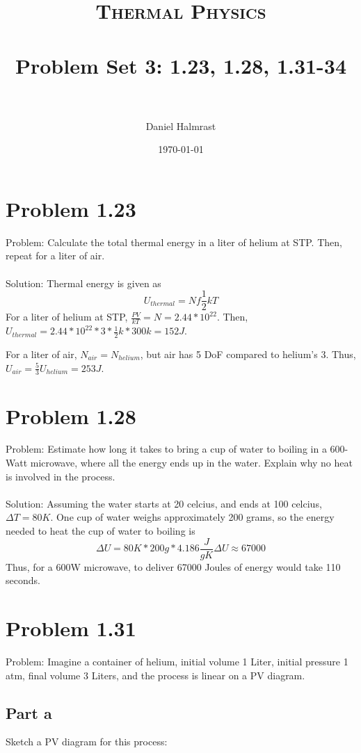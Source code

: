 \documentclass[paper=a4, fontsize=11pt]{scrartcl} %
\title{	
\normalfont \normalsize 
\textsc{Thermal Physics} \\ [25pt] %
\horrule{0.5pt} \\[0.4cm] %
\huge Problem Set 3: 1.23, 1.28, 1.31-34 \\ %
\horrule{2pt} \\[0.5cm] %
}
\author{Daniel Halmrast} %
\date{\normalsize\today} %
\numberwithin{equation}{section} %
\numberwithin{figure}{section} %
\numberwithin{table}{section} %
\begin{document}
\maketitle %


\section*{Problem 1.23}
Problem: Calculate the total thermal energy in a liter of helium at STP. Then, repeat for
a liter of air.
\\
\\
Solution:
Thermal energy is given as
\[
U_{thermal} = Nf\frac{1}{2}kT
\]
For a liter of helium at STP, $\frac{PV}{kT}=N=2.44*10^{22}$.
Then, $U_{thermal}=2.44*10^{22}*3*\frac{1}{2}k*300k=152J$.

For a liter of air, $N_{air}=N_{helium}$, but air has 5 DoF compared to helium's 3.
Thus, $U_{air}=\frac{5}{3}U_{helium}=253J$.

\section*{Problem 1.28}
Problem: Estimate how long it takes to bring a cup of water to boiling in a 600-Watt microwave,
where all the energy ends up in the water. Explain why no heat is involved in the process.
\\
\\
Solution:
Assuming the water starts at 20 celcius, and ends at 100 celcius, $\Delta T=80K$.
One cup of water weighs approximately 200 grams, so the energy needed to heat the cup of
water to boiling is
\[
\Delta U = 80K*200g*4.186\frac{J}{gK}
\Delta U \approx 67000
\]
Thus, for a 600W microwave, to deliver 67000 Joules of energy would take 110 seconds.

\section*{Problem 1.31}
Problem: Imagine a container of helium, initial volume 1 Liter, initial pressure 1 atm,
final volume 3 Liters, and the process is linear on a PV diagram.

\subsection*{Part a}
Sketch a PV diagram for this process:
\\
\\
\\
\\
\end{document}
